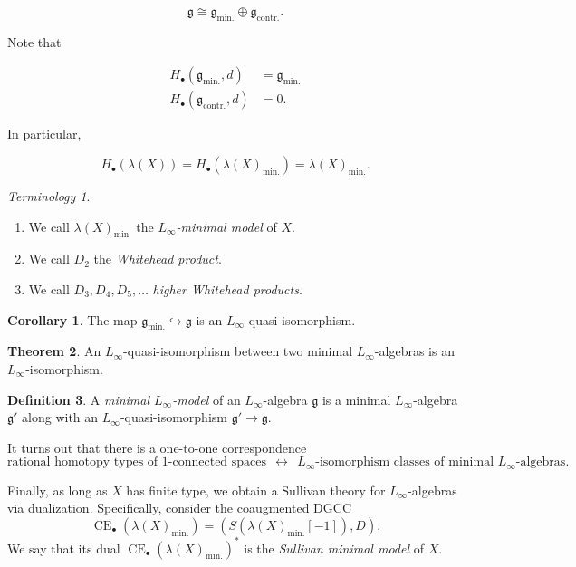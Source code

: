 \documentclass[10pt,letterpaper,cm]{nupset}
\theoremstyle{definition}
\newtheorem{defn}{Definition}[subsection]
\theoremstyle{theorem}
\newtheorem{theorem}[defn]{Theorem}
\newtheorem{corollary}[defn]{Corollary}
\theoremstyle{remark}
\newtheorem*{term}{Terminology}
\newcommand{\1}{\mathbb{1}}
\newcommand{\0}{\vec 0}
\DeclareMathOperator{\ce}{CE}
\newcommand{\be}{\begin{enumerate}}
\newcommand{\ee}{\end{enumerate}}
\begin{document}
\[
\mathfrak{g} \cong \mathfrak{g}_{\text{min.}} \oplus \mathfrak{g}_{\text{contr.}}.
\]


Note that 

\begin{align*}
H_{\bullet}(\mathfrak{g}_{\text{min.}}, d)  & = \mathfrak{g}_{\text{min.}}
\\ H_{\bullet}(\mathfrak{g}_{\text{contr.}}, d) & = 0 
.\end{align*}

In particular,

\[
H_{\bullet}(\lambda(X)) = H_{\bullet}(\lambda(X)_{\text{min.}}) = \lambda(X)_{\text{min.}}
.\] 

\begin{term} $ $
\be
\item We call $\lambda(X)_{\text{min.}}$ the \textit{$L_{\infty}$-minimal model} of $X$.
\item We call $D_2$ the \textit{Whitehead product}. 
\item We call $D_3, D_4, D_5, \ldots $ \textit{higher Whitehead products}.
\ee
\end{term}

\begin{corollary}
The map $\mathfrak{g}_{\text{min.}} \hookrightarrow \mathfrak{g}$ is an $L_{\infty}$-quasi-isomorphism.
\end{corollary}

\begin{theorem}
An $L_{\infty}$-quasi-isomorphism between two minimal $L_{\infty}$-algebras is an $L_{\infty}$-isomorphism. 
\end{theorem}

\begin{defn}
A \textit{minimal $L_{\infty}$-model} of an $L_{\infty}$-algebra $\mathfrak{g}$ is a minimal $L_{\infty}$-algebra $\mathfrak{g}'$ along with an $L_{\infty}$-quasi-isomorphism $\mathfrak{g}' \to  \mathfrak{g}$.
\end{defn}

It turns out that there is a one-to-one correspondence 
\[
\text{rational homotopy types of $1$-connected spaces} \ \  \leftrightarrow \ \ \text{$L_{\infty}$-isomorphism classes of minimal $L_{\infty}$-algebras}
.\]

\medskip

Finally, as long as $X$ has finite type, we obtain  a Sullivan theory for $L_{\infty}$-algebras via dualization. Specifically, consider the coaugmented DGCC
\[
\ce_{\bullet}(\lambda(X)_{\text{min.}}) = \left(S(\lambda(X)_{\text{min.}}\left[{-1}\right]), D\right)
.\]
We say that its dual $\ce_{\bullet}(\lambda(X)_{\text{min.}})^{\ast}$ is the \textit{Sullivan minimal model} of $X$.
\end{document}
